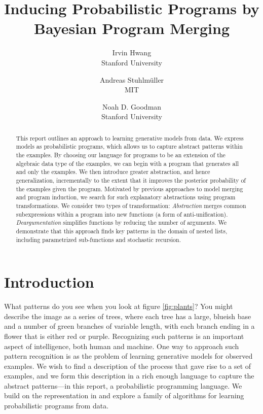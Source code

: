 \documentclass[a4paper,10pt]{article}
\begin{document}
\title{Inducing Probabilistic Programs by Bayesian Program Merging}
\author{Irvin Hwang\\Stanford University  \and Andreas Stuhlm\"{u}ller\\MIT \and Noah D. Goodman\\Stanford University}
\date{}
\maketitle
\thispagestyle{empty}
\begin{abstract}

This report outlines an approach to learning generative models from data. We express models as probabilistic programs, which allows us to capture abstract patterns within the examples. By choosing our language for programs to be an extension of the algebraic data type of the examples, we can begin with a program that generates all and only the examples. We then introduce greater abstraction, and hence generalization, incrementally to the extent that it improves the posterior probability of the examples given the program. Motivated by previous approaches to model merging and program induction, we search for such explanatory abstractions using program transformations. We consider two types of transformation: {\em Abstraction} merges common subexpressions within a program into new functions (a form of anti-unification). {\em Deargumentation} simplifies functions by reducing the number of arguments. We demonstrate that this approach finds key patterns in the domain of nested lists, including parametrized sub-functions and stochastic recursion.

\end{abstract}

\tableofcontents

\section{Introduction}

What patterns do you see when you look at figure \ref{fig:plants}? You might describe the image as a series of trees, where each tree has a large, blueish base and a number of green branches of variable length, with each branch ending in a flower that is either red or purple. Recognizing such patterns is an important aspect of intelligence, both human and machine.
One way to approach such pattern recognition is as the problem of learning generative models for observed examples. We wish to find a description of the process that gave rise to a set of examples, and we form this description in a rich enough language to capture the abstract patterns---in this report, a probabilistic programming language. 
We build on the representation in \cite{A.Stuhlmueller:2010:6d11a} and explore a family of algorithms for learning probabilistic programs from data.
\end{document}
